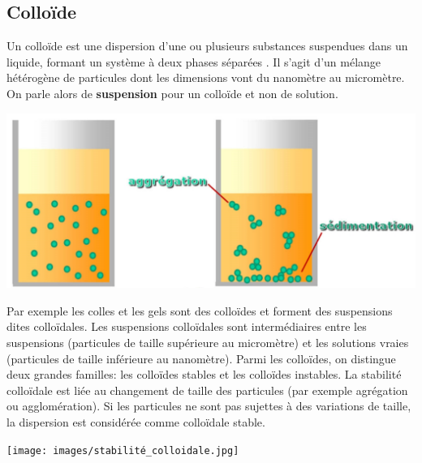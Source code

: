 \documentclass[10pt,a4paper]{article}
\begin{document}
\subsection{Colloïde}
Un colloïde est une dispersion d'une ou plusieurs substances suspendues dans un liquide, formant un système à deux phases séparées \cite{site1}. Il s'agit d'un mélange hétérogène de particules dont les dimensions vont du nanomètre au micromètre. On parle alors de \textbf{suspension} pour un colloïde et non de solution. 
\begin{center}
\includegraphics[scale=0.3]{images/solution-colloidale.jpg} 
\end{center}
Par exemple les colles et les gels sont des colloïdes et forment des suspensions dites colloïdales. Les suspensions colloïdales sont intermédiaires entre les suspensions (particules de taille supérieure au micromètre) et les solutions vraies (particules de taille inférieure au nanomètre).
\newline
\newline
Parmi les colloïdes, on distingue deux grandes familles: les colloïdes stables et les colloïdes instables. La stabilité colloïdale est liée au changement de taille des particules (par exemple agrégation ou agglomération). Si les particules ne sont pas sujettes à des variations de taille, la dispersion est considérée comme colloïdale stable.
\begin{center}
\texttt{[image: images/stabilité\_colloidale.jpg]}
\end{center}
\end{document}
